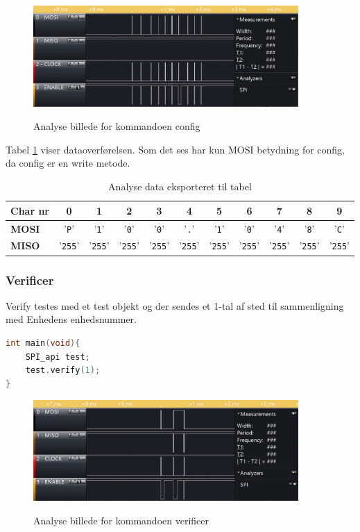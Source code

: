 \begin{figure}[H]
\centering
{\includegraphics[width=0.90\textwidth]{filer/integrationstest/billeder/spi_config}}
\caption{Analyse billede for kommandoen config}
\label{lab:scop_config}
\end{figure}

Tabel \ref{table:scop_config} viser dataoverførelsen. Som det ses har kun MOSI betydning for config, da config er en write metode. 

\begin{table}[H]
	\caption{Analyse data eksporteret til tabel}
	\centering
	\begin{tabular}{|l|c|c|c|c|c|c|c|c|c|c|}
		\hline 
		\textbf{Char nr} & \textbf{0} & \textbf{1} & \textbf{2} & \textbf{3} & \textbf{4} & \textbf{5} 
						 & \textbf{6} & \textbf{7} & \textbf{8} & \textbf{9}\\ 		
		\hline 
		\textbf{MOSI} & '\verb+P+' & '\verb+1+' & '\verb+0+' & '\verb+0+' & '\verb+.+' & '\verb+1+' 
						& '\verb+0+' & '\verb+4+' & '\verb+8+' & '\verb+C+' \\ 
		\hline 
		\textbf{MISO} & '\verb+255+' & '\verb+255+' & '\verb+255+' & '\verb+255+' & '\verb+255+' & '\verb+255+' 
						& '\verb+255+' & '\verb+255+' & '\verb+255+' & '\verb+255+' \\ 
		\hline 
	\end{tabular} 
	\label{table:scop_config}
\end{table}


\subsubsection*{Verificer}
Verify testes med et test objekt og der sendes et 1-tal af sted til sammenligning med Enhedens enhedsnummer.

\begin{lstlisting}[language=C]
int main(void){
	SPI_api test;	
	test.verify(1);
}
\end{lstlisting}

\begin{figure}[H]
\centering
{\includegraphics[width=0.90\textwidth]{filer/integrationstest/billeder/spi_verify}}
\caption{Analyse billede for kommandoen verificer}
\label{lab:scop_verify}
\end{figure}

